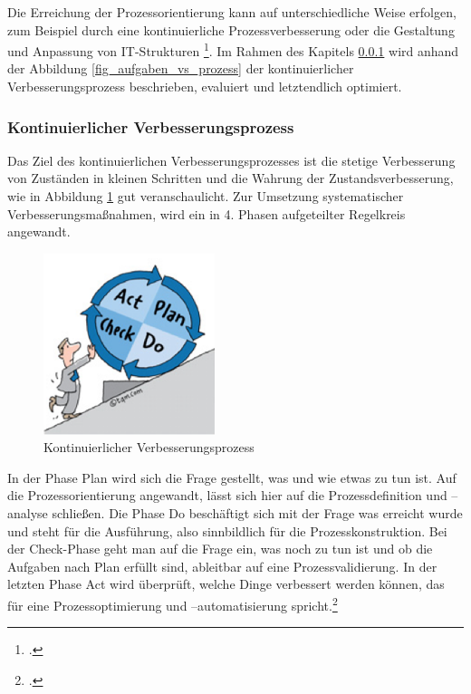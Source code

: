 Die Erreichung der Prozessorientierung kann auf unterschiedliche Weise erfolgen, zum Beispiel durch 
eine kontinuierliche Prozessverbesserung oder die Gestaltung und Anpassung von IT-Strukturen 
\footcite[Vgl.][45]{wissensmanagement_2010}. Im Rahmen des Kapitels 
\ref{subsubsection_kontinuierlicher_verbesserungsprozess}  wird anhand der Abbildung \ref{fig_aufgaben_vs_prozess} der kontinuierlicher Verbesserungsprozess beschrieben, evaluiert und letztendlich optimiert.

\subsubsection{Kontinuierlicher Verbesserungsprozess}
\label{subsubsection_kontinuierlicher_verbesserungsprozess}
Das Ziel des kontinuierlichen Verbesserungsprozesses ist die stetige Verbesserung von Zuständen in 
kleinen Schritten und die Wahrung der  Zustandsverbesserung, wie in Abbildung 
\ref{fig_kontinuierliche_verbesserung} gut veranschaulicht. Zur Umsetzung systematischer 
Verbesserungsmaßnahmen, wird ein in 4. Phasen aufgeteilter Regelkreis angewandt.

\begin{figure}[h!]
	\centering
	\includegraphics[width=5cm]{kapitel/gruppe1_2/bilder/kontinuierlicher_verbesserungsprozess} 
	\caption{Kontinuierlicher Verbesserungsprozess\protect\footnotemark}
	\label{fig_kontinuierliche_verbesserung}
\end{figure}

In der Phase Plan wird sich die Frage gestellt, was und wie etwas zu tun ist. Auf die Prozessorientierung angewandt, lässt sich hier auf die Prozessdefinition und –analyse schließen. Die Phase Do beschäftigt sich mit der Frage was erreicht wurde und steht für die Ausführung, also sinnbildlich für die Prozesskonstruktion. Bei der Check-Phase geht man auf die Frage ein, was noch zu tun ist und ob die Aufgaben nach Plan erfüllt sind, ableitbar auf eine Prozessvalidierung. In der letzten Phase Act wird überprüft, welche Dinge verbessert werden können, das für eine Prozessoptimierung und –automatisierung spricht.\footcite[Vgl.][]{yasar_kvp_2015}

